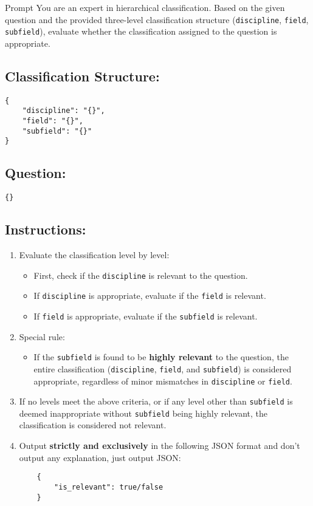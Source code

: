 \begin{promptbox}{Prompt}
You are an expert in hierarchical classification. Based on the given question and the provided three-level classification structure (\texttt{discipline}, \texttt{field}, \texttt{subfield}), evaluate whether the classification assigned to the question is appropriate.

\subsection*{Classification Structure:}
\begin{verbatim}
{
    "discipline": "{}",
    "field": "{}",
    "subfield": "{}"
}
\end{verbatim}

\subsection*{Question:}
\begin{verbatim}
{}
\end{verbatim}


\subsection*{Instructions:}
\begin{enumerate}
    \item Evaluate the classification level by level:
    \begin{itemize}
        \item First, check if the \texttt{discipline} is relevant to the question.
        \item If \texttt{discipline} is appropriate, evaluate if the \texttt{field} is relevant.
        \item If \texttt{field} is appropriate, evaluate if the \texttt{subfield} is relevant.
    \end{itemize}
    
    \item Special rule:
    \begin{itemize}
        \item If the \texttt{subfield} is found to be \textbf{highly relevant} to the question, the entire classification (\texttt{discipline}, \texttt{field}, and \texttt{subfield}) is considered appropriate, regardless of minor mismatches in \texttt{discipline} or \texttt{field}.
    \end{itemize}
    
    \item If no levels meet the above criteria, or if any level other than \texttt{subfield} is deemed inappropriate without \texttt{subfield} being highly relevant, the classification is considered not relevant.
    
    \item Output \textbf{strictly and exclusively} in the following JSON format and don't output any explanation, just output JSON:
    \begin{verbatim}
    {
        "is_relevant": true/false
    }
    \end{verbatim}
\end{enumerate}
\end{promptbox}


